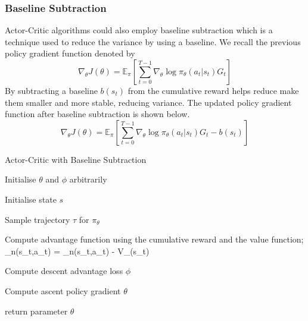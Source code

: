 \documentclass{article}
\begin{document}
\subsubsection{Baseline Subtraction}
Actor-Critic algorithms could also employ baseline subtraction which is a technique used to reduce the variance by using a baseline. We recall the previous policy gradient function denoted by 
\begin{equation*}
\nabla_\theta J(\theta) = \mathbb{E}_\pi[\sum _{t=0}^{T-1}  \nabla_\theta \log\pi_\theta (a_t|s_t)G_t]
\end{equation*}
By subtracting a baseline $b(s_t)$ from the cumulative reward helps reduce make them smaller and more stable, reducing variance. The updated policy gradient function after baseline subtraction is shown below. 
\begin{equation*}
\nabla_\theta J(\theta) = \mathbb{E}_\pi[\sum _{t=0}^{T-1}  \nabla_\theta\log\pi_\theta (a_t|s_t)G_t - b(s_t)]
\end{equation*}
\begin{algorithm}[htbp]
\caption{Actor-Critic with Baseline Subtraction}
\SetAlgoLined
\DontPrintSemicolon
\small %
Initialise $\theta$ and $\phi$ arbitrarily\;\\
{
    Initialise state $s$\;
     \item Sample trajectory $\tau$ for $\pi_\theta$
     \item
    {
     \item Compute advantage function using the cumulative reward and the value function;
     _n(s_t,a_t) = _n(s_t,a_t) - V_\phi(s_t)
    }
    \item Compute descent advantage loss $\phi$
    \item Compute ascent policy gradient $\theta$
}
return parameter $\theta$\;
\end{algorithm}
\end{document}
